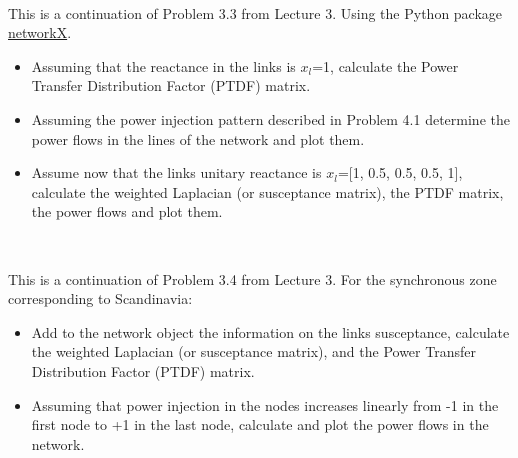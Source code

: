 \documentclass[10pt]{article}
\newenvironment{problem}[2][Problem]{\begin{trivlist}
\item[\hskip \labelsep {\bfseries #1}\hskip \labelsep {\bfseries #2.}]}{\end{trivlist}}
\begin{document}
\


\begin{problem}{4.3}
This is a continuation of Problem 3.3 from Lecture 3.
Using the Python package \href{https://networkx.org/}{networkX}.

\begin{itemize}
\item[a)] Assuming that the reactance in the links is $x_l$=1, calculate the Power Transfer Distribution Factor (PTDF) matrix.

\item[b)] Assuming the power injection pattern described in Problem 4.1 determine the power flows in the lines of the network and plot them.

\item[c)] Assume now that the links unitary reactance is $x_{l}$=[1, 0.5, 0.5, 0.5, 1], calculate the weighted Laplacian (or susceptance matrix),  the PTDF matrix, the power flows and plot them. 

\end{itemize}

\end{problem}

\

\begin{problem}{4.4}
This is a continuation of Problem 3.4 from Lecture 3. For the synchronous zone corresponding to Scandinavia:

\begin{itemize}
\item[a)] Add to the network object the information on the links susceptance, calculate the weighted Laplacian (or susceptance matrix), and the Power Transfer Distribution Factor (PTDF) matrix.

\item[b)] Assuming that power injection in the nodes increases linearly from -1 in the first node to +1 in the last node, calculate and plot the power flows in the network.

\end{itemize}

\end{problem}

\end{document}
